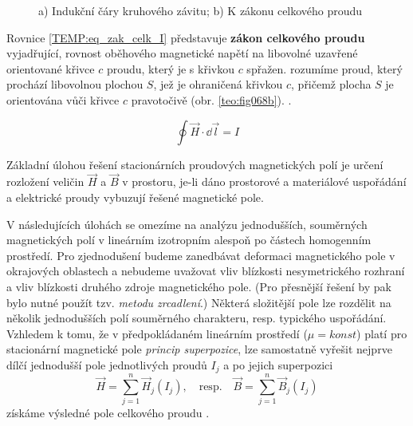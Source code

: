     \begin{figure}[ht!]
      \centering
      \hspace{1cm}
      \caption{a) Indukční čáry kruhového závitu; b) K zákonu celkového proudu}
      \label{teo:fig068}
    \end{figure}

    Rovnice \ref{TEMP:eq_zak_celk_I} představuje \textbf{zákon celkového proudu} vyjadřující,
    rovnost oběhového magnetické napětí na libovolné uzavřené orientované křivce $c$ proudu, který
    je s křivkou $c$ spřažen.  rozumíme proud, který prochází 
    libovolnou plochou $S$, jež je ohraničená křivkou $c$, přičemž plocha $S$ je orientována vůči 
    křivce $c$ pravotočivě (obr. \ref{teo:fig068b}). \cite[s.~55]{Mayer2001}.

    \begin{equation}\label{TEMP:eq_zak_celk_I}
      \oint\vec{H}\cdot \dd{\vec{l}} = I   
    \end{equation}    
       
    Základní úlohou řešení stacionárních proudových magnetických polí je určení rozložení veličin 
    $\vec{H}$ a $\vec{B}$ v prostoru, je-li dáno prostorové a materiálové uspořádání a elektrické 
    proudy vybuzují řešené magnetické pole.
    
    V následujících úlohách se omezíme na analýzu jednodušších, souměrných magnetických polí v
    lineárním izotropním alespoň po částech homogenním prostředí. Pro zjednodušení budeme zanedbávat
    deformaci magnetického pole v okrajových oblastech a nebudeme uvažovat vliv blízkosti
    nesymetrického rozhraní a vliv blízkosti druhého zdroje magnetického pole. (Pro přesnější řešení
    by pak bylo nutné použít tzv. \emph{metodu zrcadlení}.) Některá složitější pole lze rozdělit na
    několik jednodušších polí souměrného charakteru, resp. typického uspořádání. Vzhledem k tomu, že
    v předpokládaném lineárním prostředí ($\mu = konst$) platí pro stacionární magnetické pole
    \emph{princip superpozice}, lze samostatně vyřešit nejprve dílčí jednodušší pole jednotlivých
    proudů $I_j$ a po jejich superpozici
    \begin{equation}\label{TEMP:eq_superp_mag_pole}
      \vec{H}= \sum_{j=1}^n\vec{H}_j(I_j), \quad\text{resp.}\quad \vec{B}= 
      \sum_{j=1}^n\vec{B}_j(I_j)   
    \end{equation}
    získáme výsledné pole celkového proudu \cite[s.~181]{Kotlan1999}. 

